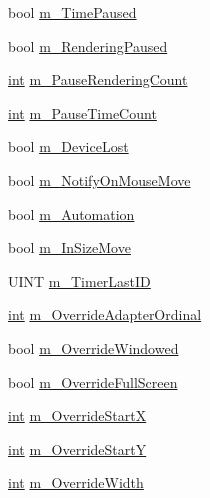 \begin{DoxyCompactItemize}
\item 
bool \hyperlink{struct_d_x_u_t_state_1_1_s_t_a_t_e_aa22d41686445da99b82a46a5f49bfae4}{m\_\-TimePaused}
\item 
bool \hyperlink{struct_d_x_u_t_state_1_1_s_t_a_t_e_a4040cb6f076bd5208ec9c6539393047c}{m\_\-RenderingPaused}
\item 
\hyperlink{_d_x_u_tgui_8cpp_a2d77ed03302b6978834ee3b6f57837fb}{int} \hyperlink{struct_d_x_u_t_state_1_1_s_t_a_t_e_ab3acaa464ba593cf6df9196cd071b91c}{m\_\-PauseRenderingCount}
\item 
\hyperlink{_d_x_u_tgui_8cpp_a2d77ed03302b6978834ee3b6f57837fb}{int} \hyperlink{struct_d_x_u_t_state_1_1_s_t_a_t_e_ab3b1ebce3c1b125809501accfb34c380}{m\_\-PauseTimeCount}
\item 
bool \hyperlink{struct_d_x_u_t_state_1_1_s_t_a_t_e_a69b4af51c36f8bf6de63b387f3d082a0}{m\_\-DeviceLost}
\item 
bool \hyperlink{struct_d_x_u_t_state_1_1_s_t_a_t_e_a5362b802ff09ba5994aed7cedffe017c}{m\_\-NotifyOnMouseMove}
\item 
bool \hyperlink{struct_d_x_u_t_state_1_1_s_t_a_t_e_a7f0689204ca27a9a3ef94a4713eebbd5}{m\_\-Automation}
\item 
bool \hyperlink{struct_d_x_u_t_state_1_1_s_t_a_t_e_ae0574477ea8dcdc926d419b7525fb86c}{m\_\-InSizeMove}
\item 
UINT \hyperlink{struct_d_x_u_t_state_1_1_s_t_a_t_e_a4ac1c84ee64b88305935da70d01fb1af}{m\_\-TimerLastID}
\item 
\hyperlink{_d_x_u_tgui_8cpp_a2d77ed03302b6978834ee3b6f57837fb}{int} \hyperlink{struct_d_x_u_t_state_1_1_s_t_a_t_e_a417eb390963832e2078b595479497116}{m\_\-OverrideAdapterOrdinal}
\item 
bool \hyperlink{struct_d_x_u_t_state_1_1_s_t_a_t_e_a05e71b6c9af3c7cf536b8196f00b9cea}{m\_\-OverrideWindowed}
\item 
bool \hyperlink{struct_d_x_u_t_state_1_1_s_t_a_t_e_a4e372f17550ce6bdda298c0be088c06b}{m\_\-OverrideFullScreen}
\item 
\hyperlink{_d_x_u_tgui_8cpp_a2d77ed03302b6978834ee3b6f57837fb}{int} \hyperlink{struct_d_x_u_t_state_1_1_s_t_a_t_e_a9c9bc69195b09d69d5cba549b522466c}{m\_\-OverrideStartX}
\item 
\hyperlink{_d_x_u_tgui_8cpp_a2d77ed03302b6978834ee3b6f57837fb}{int} \hyperlink{struct_d_x_u_t_state_1_1_s_t_a_t_e_afd0d682b4642869b1a6ec63cfd279ff6}{m\_\-OverrideStartY}
\item 
\hyperlink{_d_x_u_tgui_8cpp_a2d77ed03302b6978834ee3b6f57837fb}{int} \hyperlink{struct_d_x_u_t_state_1_1_s_t_a_t_e_a9bd7128ca000d0cc54872df48bfa4ff0}{m\_\-OverrideWidth}

\end{DoxyCompactItemize}
